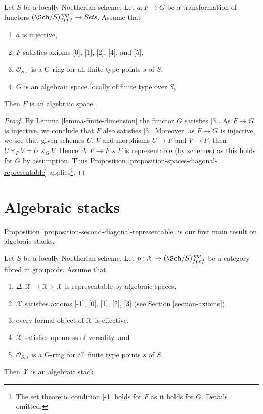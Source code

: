 \begin{lemma}
\label{lemma-monomorphism}
Let $S$ be a locally Noetherian scheme. Let $a : F \to G$ be a transformation
of functors $(\Sch/S)_{fppf}^{opp} \to \textit{Sets}$.
Assume that
\begin{enumerate}
\item $a$ is injective,
\item $F$ satisfies axioms [0], [1], [2], [4], and [5],
\item $\mathcal{O}_{S, s}$ is a G-ring for all finite type points $s$ of $S$,
\item $G$ is an algebraic space locally of finite type over $S$,
\end{enumerate}
Then $F$ is an algebraic space.
\end{lemma}

\begin{proof}
By Lemma \ref{lemma-finite-dimension} the functor $G$ satisfies [3].
As $F \to G$ is injective, we conclude that $F$ also satisfies [3].
Moreover, as $F \to G$ is injective, we see that given schemes
$U$, $V$ and morphisms $U \to F$ and $V \to F$, then
$U \times_F V = U \times_G V$. Hence $\Delta : F \to F \times F$ is
representable (by schemes) as this holds for $G$ by assumption.
Thus Proposition \ref{proposition-spaces-diagonal-representable}
applies\footnote{The set
theoretic condition [-1] holds for $F$ as it holds for $G$. Details
omitted.}.
\end{proof}












\section{Algebraic stacks}
\label{section-algebraic-stacks}

\noindent
Proposition \ref{proposition-second-diagonal-representable} is our first
main result on algebraic stacks.

\begin{lemma}
\label{lemma-diagonal-representable}
Let $S$ be a locally Noetherian scheme. Let
$p : \mathcal{X} \to (\Sch/S)_{fppf}^{opp}$ be a category fibred in groupoids.
Assume that
\begin{enumerate}
\item $\Delta : \mathcal{X} \to \mathcal{X} \times \mathcal{X}$
is representable by algebraic spaces,
\item $\mathcal{X}$ satisfies axioms [-1], [0], [1], [2], [3] (see
Section \ref{section-axioms}),
\item every formal object of $\mathcal{X}$ is effective,
\item $\mathcal{X}$ satisfies openness of versality, and
\item $\mathcal{O}_{S, s}$ is a G-ring for all finite type points $s$ of $S$.
\end{enumerate}
Then $\mathcal{X}$ is an algebraic stack.
\end{lemma}

